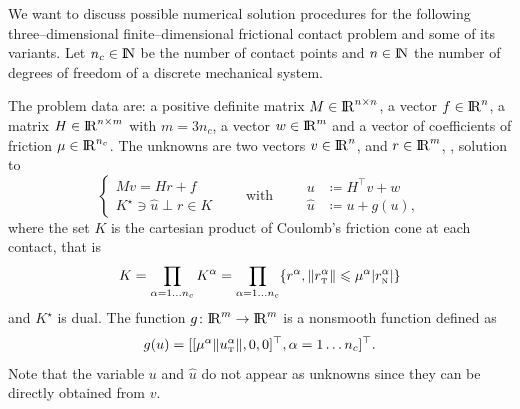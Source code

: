 We want to discuss possible numerical solution procedures for the following three--dimensional finite--dimensional frictional contact problem and some of its variants.  Let $n_c\in \mathrm{I\!N}$ be the number of contact points and $n\in\mathrm{I\!N}$ the number of degrees of freedom of a discrete mechanical system.

The problem data are: a positive definite matrix ${M} \in \mathrm{I\!R}^{n \times n}$, a vector $ {f} \in \mathrm{I\!R}^n$, a matrix  ${H} \in \mathrm{I\!R}^{n \times m}$ with $m= 3n_c$, a vector $w \in \mathrm{I\!R}^{m}$ and a vector of coefficients of friction $\mu \in \mathrm{I\!R}^{n_c}$.
The unknowns are two vectors $ {v} \in \mathrm{I\!R}^n$,  and $r\in \mathrm{I\!R}^m$, , solution to
\begin{equation}\label{eq:soccp1-intro}
 \begin{cases}
  M v = {H} {r} + {f}\\
  K^\star \ni {\hat u} \perp r \in K
 \end{cases}\qquad\text{with}\qquad
 \begin{aligned}
    u &\coloneqq H^\top v + w\\
    \hat u &\coloneqq u + g(u),
   \end{aligned}
\end{equation}
where the set $K$ is the cartesian product of Coulomb's friction cone at each contact, that is
\begin{equation}
  \label{eq:CC}
  K = \prod_{\alpha=1\ldots n_c} K^{\alpha}  = \prod_{\alpha=1\ldots n_c} \{r^\alpha, \|r^\alpha_\t \| \leq \mu^\alpha |r^\alpha_\n| \}
\end{equation}
and $K^\star$ is dual. The function $g\colon\mathrm{I\!R}^m\to\mathrm{I\!R}^m$ is a nonsmooth function defined as
\begin{equation}
g(u) = [[\mu^\alpha  \|u^\alpha_\t\|, 0, 0]^\top, \alpha = 1\ldots n_c]^\top\label{eq:gg}. 
\end{equation} Note that the variable $u$ and $\hat u$  do not appear as unknowns since they can be directly obtained from $v$.

